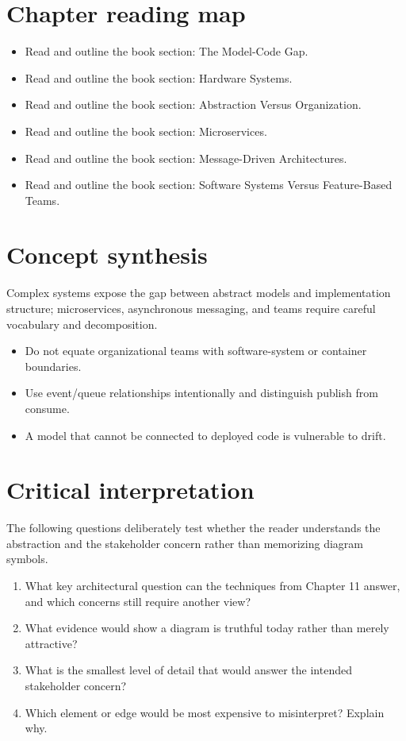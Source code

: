 \documentclass[10pt,letterpaper]{article}
\begin{document}
\section{Chapter reading map}
\begin{itemize}
\item Read and outline the book section: The Model-Code Gap.
\item Read and outline the book section: Hardware Systems.
\item Read and outline the book section: Abstraction Versus Organization.
\item Read and outline the book section: Microservices.
\item Read and outline the book section: Message-Driven Architectures.
\item Read and outline the book section: Software Systems Versus Feature-Based Teams.
\end{itemize}

\section{Concept synthesis}
Complex systems expose the gap between abstract models and implementation structure; microservices, asynchronous messaging, and teams require careful vocabulary and decomposition.

\begin{itemize}
\item Do not equate organizational teams with software-system or container boundaries.
\item Use event/queue relationships intentionally and distinguish publish from consume.
\item A model that cannot be connected to deployed code is vulnerable to drift.
\end{itemize}

\section{Critical interpretation}
The following questions deliberately test whether the reader understands the abstraction and the stakeholder concern rather than memorizing diagram symbols.

\begin{enumerate}
\item What key architectural question can the techniques from Chapter 11 answer, and which concerns still require another view?
\item What evidence would show a diagram is truthful today rather than merely attractive?
\item What is the smallest level of detail that would answer the intended stakeholder concern?
\item Which element or edge would be most expensive to misinterpret? Explain why.
\end{enumerate}
\end{document}
